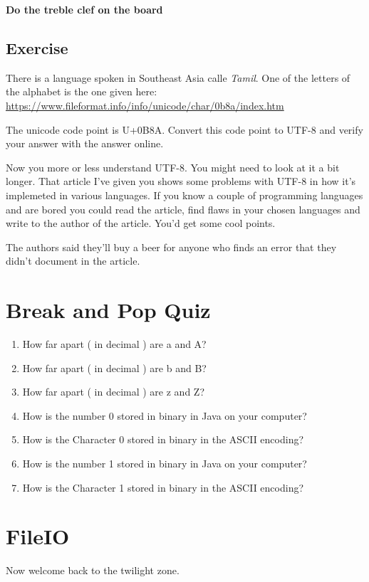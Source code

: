 \documentclass[12pt]{article}
\begin{document}
\begin{center}
\textbf{Do the treble clef on the board}
\end{center}

\subsection{Exercise}
There is a language spoken in Southeast Asia calle \textit{Tamil}.
One of the letters of the alphabet is the one given here: \url{https://www.fileformat.info/info/unicode/char/0b8a/index.htm}

The unicode code point is U+0B8A. Convert this code point to UTF-8 and verify your answer with the answer online.

Now you more or less understand UTF-8. You might need to look at it a bit longer. That article I've given you shows some problems with UTF-8 in how it's implemeted in various languages. If you know a couple of programming languages and are bored you could read the article, find flaws in your chosen languages and write to the author of the article. You'd get some cool points.

The authors said they'll buy a beer for anyone who finds an error that they didn't document in the article.

\section{Break and Pop Quiz}
\begin{enumerate}
\item How far apart ( in decimal ) are a and A?
\item How far apart ( in decimal ) are b and B?
\item How far apart ( in decimal ) are z and Z?

\item How is the number 0 stored in binary in Java on your computer?
\item How is the Character 0 stored in binary in the ASCII encoding?

\item How is the number 1 stored in binary in Java on your computer?
\item How is the Character 1 stored in binary in the ASCII encoding?
\end{enumerate}

\section{FileIO}
Now welcome back to the twilight zone.
\end{document}
